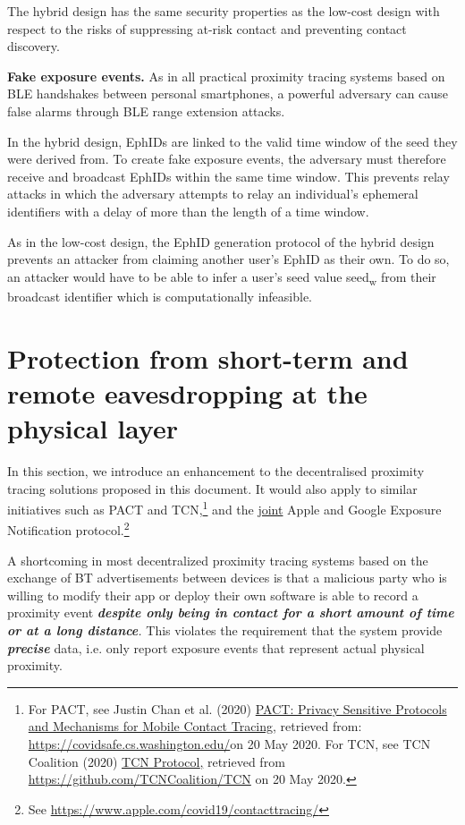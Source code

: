 \documentclass{article}
\begin{document}
The hybrid design has the same security properties as the low-cost
design with respect to the risks of suppressing at-risk contact and
preventing contact discovery.

\textbf{Fake exposure events.} As in all practical proximity tracing
systems based on BLE handshakes between personal smartphones, a powerful
adversary can cause false alarms through BLE range extension attacks.

In the hybrid design, EphIDs are linked to the valid time window of the
seed they were derived from. To create fake exposure events, the
adversary must therefore receive and broadcast EphIDs within the same
time window. This prevents relay attacks in which the adversary attempts
to relay an individual's ephemeral identifiers with a delay of more than
the length of a time window.

As in the low-cost design, the EphID generation protocol of the hybrid
design prevents an attacker from claiming another user's EphID as their
own. To do so, an attacker would have to be able to infer a user's seed
value seed\textsubscript{w} from their broadcast identifier which is
computationally infeasible.

\section{Protection from short-term and remote
eavesdropping at the physical layer}\label{protection-from-short-term-and-remote-eavesdropping-at-the-physical-layer}

In this section, we introduce an enhancement to the decentralised
proximity tracing solutions proposed in this document. It would also
apply to similar initiatives such as PACT and TCN,\footnote{For PACT,
  see Justin Chan et al. (2020)
  \href{https://arxiv.org/pdf/2004.03544.pdf}{{PACT: Privacy Sensitive
  Protocols and Mechanisms for Mobile Contact Tracing},} retrieved from:
  \href{https://covidsafe.cs.washington.edu/}{{https://covidsafe.cs.washington.edu/}}on
  20 May 2020. For TCN, see TCN Coalition (2020)
  \href{https://github.com/TCNCoalition/TCN}{{TCN Protocol},} retrieved
  from
  \href{https://github.com/TCNCoalition/TCN}{{https://github.com/TCNCoalition/TCN}}
  on 20 May 2020.} and the
\href{https://www.apple.com/covid19/contacttracing/}{{joint}} Apple and
Google Exposure Notification protocol.\footnote{See
  \href{https://www.apple.com/covid19/contacttracing/}{{https://www.apple.com/covid19/contacttracing/}}}

A shortcoming in most decentralized proximity tracing systems based on
the exchange of BT advertisements between devices is that a malicious
party who is willing to modify their app or deploy their own software is
able to record a proximity event \emph{\textbf{despite only being in
contact for a short amount of time or at a long distance}.} This
violates the requirement that the system provide \emph{\textbf{precise}}
data, i.e. only report exposure events that represent actual physical
proximity.
\end{document}
